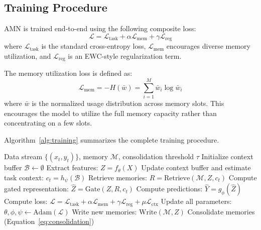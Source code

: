 \documentclass[11pt]{article}
\begin{document}
\subsection{Training Procedure}

AMN is trained end-to-end using the following composite loss:
\begin{equation}
    \mathcal{L} = \mathcal{L}_{\text{task}} + \alpha \mathcal{L}_{\text{mem}} + \gamma \mathcal{L}_{\text{reg}}
\end{equation}
where $\mathcal{L}_{\text{task}}$ is the standard cross-entropy loss, $\mathcal{L}_{\text{mem}}$ encourages diverse memory utilization, and $\mathcal{L}_{\text{reg}}$ is an EWC-style regularization term.

The memory utilization loss is defined as:
\begin{equation}
    \mathcal{L}_{\text{mem}} = -H(\bar{w}) = \sum_{i=1}^{M} \bar{w}_i \log \bar{w}_i
\end{equation}
where $\bar{w}$ is the normalized usage distribution across memory slots. This encourages the model to utilize the full memory capacity rather than concentrating on a few slots.

Algorithm~\ref{alg:training} summarizes the complete training procedure.

\begin{algorithm}
\caption{AMN Training Procedure}
\label{alg:training}
\begin{algorithmic}[1]
\REQUIRE Data stream $\{(x_t, y_t)\}$, memory $\mathcal{M}$, consolidation threshold $\tau$
\STATE Initialize context buffer $\mathcal{B} \leftarrow \emptyset$
    \STATE Extract features: $Z = f_\theta(X)$
    \STATE Update context buffer and estimate task context: $c_t = h_\psi(\mathcal{B})$
    \STATE Retrieve memories: $R = \text{Retrieve}(\mathcal{M}, Z, c_t)$
    \STATE Compute gated representation: $\hat{Z} = \text{Gate}(Z, R, c_t)$
    \STATE Compute predictions: $\hat{Y} = g_\phi(\hat{Z})$
    \STATE Compute loss: $\mathcal{L} = \mathcal{L}_{\text{task}} + \alpha \mathcal{L}_{\text{mem}} + \gamma \mathcal{L}_{\text{reg}} + \mu \mathcal{L}_{\text{ctx}}$
    \STATE Update all parameters: $\theta, \phi, \psi \leftarrow \text{Adam}(\mathcal{L})$
    \STATE Write new memories: $\text{Write}(\mathcal{M}, Z)$
        \STATE Consolidate memories (Equation~\ref{eq:consolidation})
    \ENDIF
\ENDFOR
\end{algorithmic}
\end{algorithm}
\end{document}
